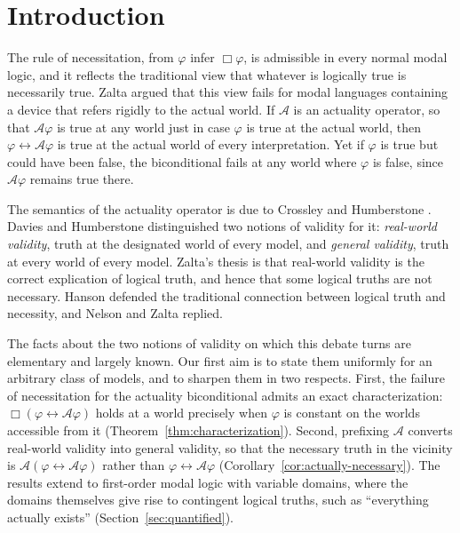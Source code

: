\documentclass[11pt]{amsart}
\theoremstyle{plain}
\theoremstyle{definition}
\theoremstyle{remark}
\newcommand{\Act}{\mathcal{A}}
\begin{document}
\maketitle

\section{Introduction}
\label{sec:intro}

The rule of necessitation, from $\varphi$ infer $\Box\varphi$, is
admissible in every normal modal logic, and it reflects the traditional
view that whatever is logically true is necessarily true. Zalta
\cite{zalta1988} argued that this view fails for modal languages
containing a device that refers rigidly to the actual world. If $\Act$
is an actuality operator, so that $\Act\varphi$ is true at any world
just in case $\varphi$ is true at the actual world, then
$\varphi \leftrightarrow \Act\varphi$ is true at the actual world of
every interpretation. Yet if $\varphi$ is true but could have been
false, the biconditional fails at any world where $\varphi$ is false,
since $\Act\varphi$ remains true there.

The semantics of the actuality operator is due to Crossley and
Humberstone \cite{crossley1977}. Davies and Humberstone
\cite{davies1980} distinguished two notions of validity for it:
\emph{real-world validity}, truth at the designated world of every
model, and \emph{general validity}, truth at every world of every
model. Zalta's thesis is that real-world validity is the correct
explication of logical truth, and hence that some logical truths are
not necessary. Hanson \cite{hanson2006} defended the traditional
connection between logical truth and necessity, and Nelson and Zalta
\cite{nelson2012} replied.

The facts about the two notions of validity on which this debate turns
are elementary and largely known. Our first aim is to state them
uniformly for an arbitrary class of models, and to sharpen them in two
respects. First, the failure of necessitation for the actuality
biconditional admits an exact characterization:
$\Box(\varphi \leftrightarrow \Act\varphi)$ holds at a world precisely
when $\varphi$ is constant on the worlds accessible from it
(Theorem~\ref{thm:characterization}). Second, prefixing $\Act$ converts
real-world validity into general validity, so that the necessary truth
in the vicinity is $\Act(\varphi \leftrightarrow \Act\varphi)$ rather
than $\varphi \leftrightarrow \Act\varphi$
(Corollary~\ref{cor:actually-necessary}). The results extend to
first-order modal logic with variable domains, where the domains
themselves give rise to contingent logical truths, such as
``everything actually exists'' (Section~\ref{sec:quantified}).
\end{document}
